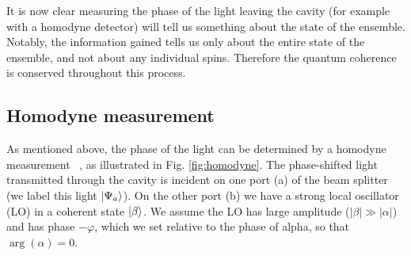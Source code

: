 It is now clear measuring the phase of the light leaving the cavity
(for example with a homodyne detector) will tell us something about
the state of the ensemble. Notably, the information gained tells us only about
the entire state of the ensemble, and not about any individual spins. Therefore
the quantum coherence is conserved throughout this process.

\subsection{Homodyne measurement}

As mentioned above, the phase of the light can be determined by a homodyne
measurement ~\cite{agarwal2012}, as illustrated in Fig.  \ref{fig:homodyne}.
The phase-shifted light transmitted through the cavity is incident on one port
(a) of the beam splitter (we label this light $\ket{\Psi_a}$). On the other
port (b) we have a strong local oscillator (LO) in a coherent state
$\ket{\beta}$. We assume the LO has large amplitude ($|\beta|
\gg |\alpha|$) and has phase $-\varphi$, which we set relative to the phase of
alpha, so that $\arg(\alpha)=0$.

